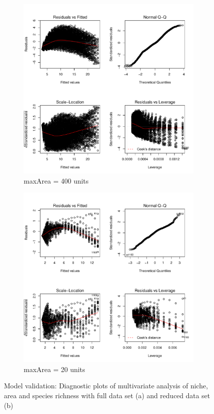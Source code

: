 \documentclass{article}
\begin{document}
\begin{figure}[h!]
  \centering
  \begin{subfigure}[b]{0.4\linewidth}
    \includegraphics[width=\linewidth]{../../Results/Simulation/NicheAreaLmPlot_1.pdf}
    \caption{maxArea = 400 units}
  \end{subfigure}
  \begin{subfigure}[b]{0.4\linewidth}
    \includegraphics[width=\linewidth]{../../Results/Simulation/NicheAreaLmPlot_20.pdf}
    \caption{maxArea = 20 units}
  \end{subfigure}
  \caption{Model validation: Diagnostic plots of multivariate analysis of niche, area and species richness with full data set (a) and reduced data set (b)}
  \label{fig:Model validation multivariate 2}
\end{figure}\bigskip
\end{document}
